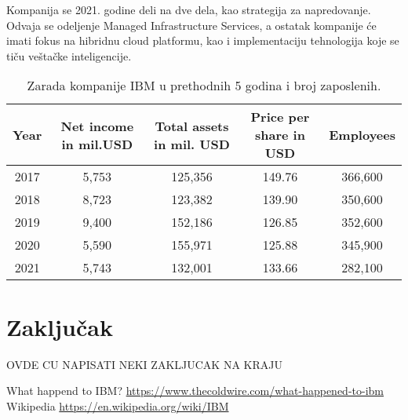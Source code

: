 \documentclass[a4paper]{article}
\begin{document}
Kompanija se 2021. godine deli na dve dela, kao strategija za napredovanje. Odvaja se odeljenje Managed Infrastructure Services, a ostatak kompanije će imati fokus na hibridnu cloud platformu, kao i implementaciju tehnologija koje se tiču veštačke inteligencije.


\begin{table}[h!]
\begin{center}
\caption{Zarada kompanije IBM u prethodnih 5 godina i broj zaposlenih. \cite{tabela}}
\begin{tabular}{|c|c|c|c|c|} \hline
Year& Net income in mil.USD& Total assets in mil. USD& Price per share in USD& Employees \\ \hline
2017	&5,753	&125,356	&149.76	&366,600\\ \hline
2018	&8,723	&123,382	&139.90	&350,600\\ \hline
2019	&9,400	&152,186	&126.85	&352,600\\ \hline
2020	&5,590	&155,971	&125.88	&345,900\\ \hline
2021	&5,743	&132,001	&133.66	&282,100\\ \hline
\end{tabular}
\label{tab:tabela1}
\end{center}
\end{table}

\section{Zaključak}
OVDE CU NAPISATI NEKI ZAKLJUCAK NA KRAJU %

\renewcommand{\refname}{Literatura}
\begin{thebibliography}{9}

 What happend to IBM? 
\url{https://www.thecoldwire.com/what-happened-to-ibm}
 Wikipedia %
\url{https://en.wikipedia.org/wiki/IBM}
\end{thebibliography}
\end{document}
